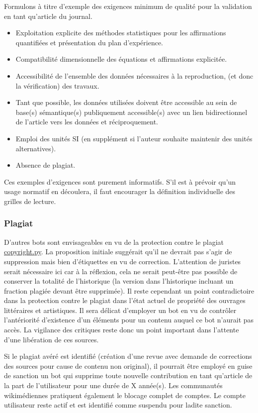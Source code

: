 Formulons à titre d'exemple des exigences minimum de qualité pour la validation en tant qu'article du journal.
\begin{itemize}
\item Exploitation explicite des méthodes statistiques pour les affirmations quantifiées et présentation du plan d'expérience.
\item Compatibilité dimensionnelle des équations et affirmations explicitée.
\item Accessibilité de l'ensemble des données nécessaires à la reproduction, (et donc la vérification) des travaux.
\item Tant que possible, les données utilisées doivent être accessible au sein de base(s) sémantique(s) publiquement accessible(s) avec un lien bidirectionnel de l'article vers les données et réciproquement.
\item Emploi des unités SI (en supplément si l'auteur souhaite maintenir des unités alternatives).
\item Absence de plagiat.
\end{itemize}
Ces exemples d'exigences sont purement informatifs.
S'il est à prévoir qu'un usage normatif en découlera, il faut encourager la définition individuelle des grilles de lecture.

\subsubsection{Plagiat}
D'autres bots sont envisageables en vu de la protection contre le plagiat \href{https://www.mediawiki.org/wiki/Manual:Pywikibot/Compat/copyright.py}{copyright.py}.
La proposition initiale suggérait qu'il ne devrait pas s’agir de suppression mais bien d'étiquettes en vu de correction.
L'attention de juristes serait nécessaire ici car à la réflexion, cela ne serait peut-être pas possible de conserver la totalité de l'historique (la version dans l'historique incluant un fraction plagiée devant être supprimée).
Il reste cependant un point contradictoire dans la protection contre le plagiat dans l'état actuel de propriété des ouvrages littéraires et artistiques.
Il sera délicat d'employer un bot en vu de contrôler l'antériorité d’existence d'un éléments pour un contenu auquel ce bot n'aurait pas accès.
La vigilance des critiques reste donc un point important dans l'attente d'une libération de ces sources.

Si le plagiat avéré est identifié (création d'une revue avec demande de corrections des sources pour cause de contenu non original), il pourrait être employé en guise de sanction un bot qui supprime toute nouvelle contribution en tant qu'article de la part de l'utilisateur pour une durée de X année(s).
Les communautés wikimédiennes pratiquent également le blocage complet de comptes.
Le compte utilisateur reste actif et est identifié comme suspendu pour ladite sanction.

